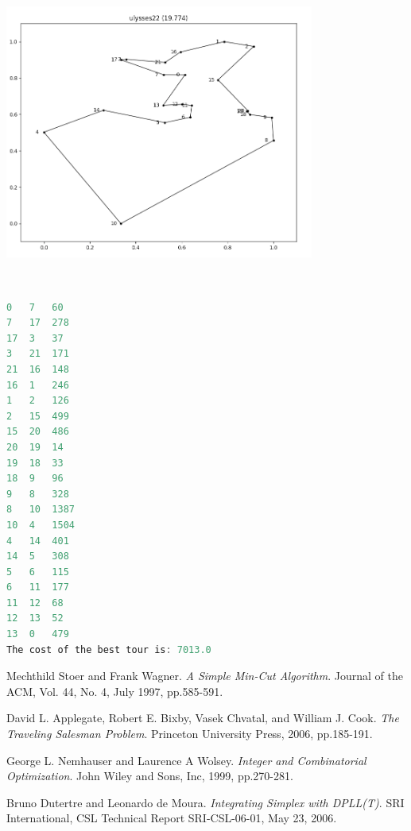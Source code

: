 \documentclass{article}
\begin{document}
\begin{flushleft}
\begin{flushleft}
\includegraphics[width=4in, height=4in]{ulysses_optTour}

\begin{lstlisting}[language=C]
0   7   60
7   17  278
17  3   37
3   21  171
21  16  148
16  1   246
1   2   126
2   15  499
15  20  486
20  19  14
19  18  33
18  9   96
9   8   328
8   10  1387
10  4   1504
4   14  401
14  5   308
5   6   115
6   11  177
11  12  68
12  13  52
13  0   479
The cost of the best tour is: 7013.0
\end{lstlisting}

\end{flushleft}


\end{flushleft}


\begin{thebibliography}{9}
Mechthild Stoer and Frank Wagner.
\textit{A Simple Min-Cut Algorithm}.
Journal of the ACM, Vol. 44, No. 4, July 1997, pp.585-591.

David L. Applegate, Robert E. Bixby, Vasek Chvatal, and William J. Cook.
\textit{The Traveling Salesman Problem}.
Princeton University Press, 2006, pp.185-191.

George L. Nemhauser and Laurence A Wolsey.
\textit{Integer and Combinatorial Optimization}.
John Wiley and Sons, Inc, 1999, pp.270-281.

Bruno Dutertre and Leonardo de Moura.
\textit{Integrating Simplex with DPLL(T)}.
SRI International, CSL Technical Report SRI-CSL-06-01, May 23, 2006.
\end{thebibliography}
\end{document}

